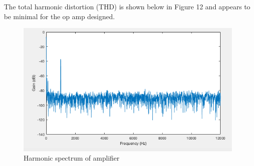 The total harmonic distortion (THD) is shown below in Figure 12 and appears to be minimal for the op amp designed.

		\begin{figure}[H]
	\begin{center}
		\includegraphics[scale=.40]{ExperimentalImplementation/spectrum.png}
		\caption{Harmonic spectrum of amplifier}
		\label{fig:spectrum}
	\end{center}
\end{figure}



	
	